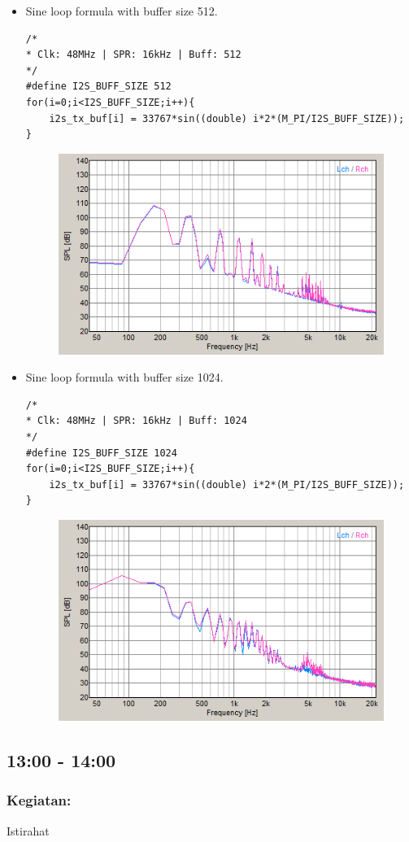 \documentclass[12pt,]{article}
\begin{document}
\begin{itemize}
\begin{itemize}
			\item Sine loop formula with buffer size 512.
			\begin{verbatim}
/*
* Clk: 48MHz | SPR: 16kHz | Buff: 512
*/
#define I2S_BUFF_SIZE 512	
for(i=0;i<I2S_BUFF_SIZE;i++){
	i2s_tx_buf[i] = 33767*sin((double) i*2*(M_PI/I2S_BUFF_SIZE));
}
			\end{verbatim}
			\begin{figure}[H]
				\centering
				\includegraphics[width=0.5\linewidth]{result/day_1/max512}
			\end{figure}
		
			\newpage
			\item Sine loop formula with buffer size 1024.
			\begin{verbatim}
/*
* Clk: 48MHz | SPR: 16kHz | Buff: 1024
*/
#define I2S_BUFF_SIZE 1024	
for(i=0;i<I2S_BUFF_SIZE;i++){
	i2s_tx_buf[i] = 33767*sin((double) i*2*(M_PI/I2S_BUFF_SIZE));
}
			\end{verbatim}
			\begin{figure}[H]
				\centering
				\includegraphics[width=0.5\linewidth]{result/day_1/max1024}
			\end{figure}
			
		\end{itemize}
	\end{itemize}
	
	\subsection{13:00 - 14:00}
	\subsubsection{Kegiatan:}
	Istirahat
	
\end{document}
